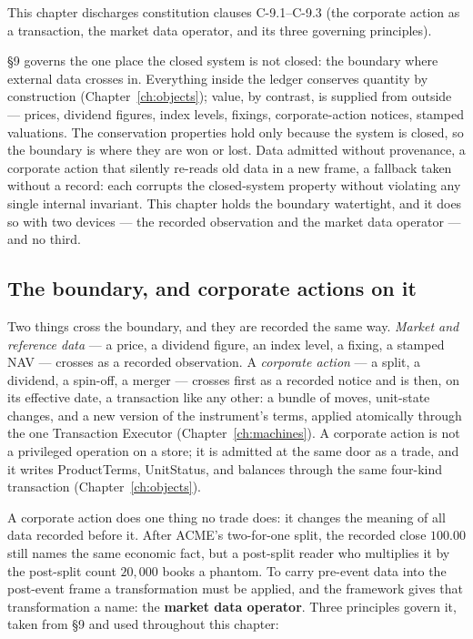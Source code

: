 \documentclass[11pt,a4paper]{article}
\begin{document}
This chapter discharges constitution clauses C-9.1--C-9.3 (the corporate action as a transaction, the market data operator, and its three governing principles).

\S 9 governs the one place the closed system is not closed: the boundary where external
data crosses in. Everything inside the ledger conserves quantity by construction
(Chapter~\ref{ch:objects}); value, by contrast, is supplied from outside --- prices,
dividend figures, index levels, fixings, corporate-action notices, stamped valuations.
The conservation properties hold only because the system is closed, so the boundary is
where they are won or lost. Data admitted without provenance, a corporate action that
silently re-reads old data in a new frame, a fallback taken without a record: each
corrupts the closed-system property without violating any single internal invariant. This
chapter holds the boundary watertight, and it does so with two devices --- the recorded
observation and the market data operator --- and no third.

\subsection{The boundary, and corporate actions on it}

Two things cross the boundary, and they are recorded the same way. \emph{Market and
reference data} --- a price, a dividend figure, an index level, a fixing, a stamped NAV
--- crosses as a recorded observation. A \emph{corporate action} --- a split, a dividend,
a spin-off, a merger --- crosses first as a recorded notice and is then, on its effective
date, a transaction like any other: a bundle of moves, unit-state changes, and a new
version of the instrument's terms, applied atomically through the one Transaction Executor
(Chapter~\ref{ch:machines}). A corporate action is not a privileged operation on a store;
it is admitted at the same door as a trade, and it writes ProductTerms, UnitStatus, and
balances through the same four-kind transaction (Chapter~\ref{ch:objects}).

A corporate action does one thing no trade does: it changes the meaning of all data
recorded before it. After ACME's two-for-one split, the recorded close $100.00$ still
names the same economic fact, but a post-split reader who multiplies it by the post-split
count $20{,}000$ books a phantom. To carry pre-event data into the post-event frame a
transformation must be applied, and the framework gives that transformation a name: the
\textbf{market data operator}. Three principles govern it, taken from \S 9 and used
throughout this chapter:
\end{document}
